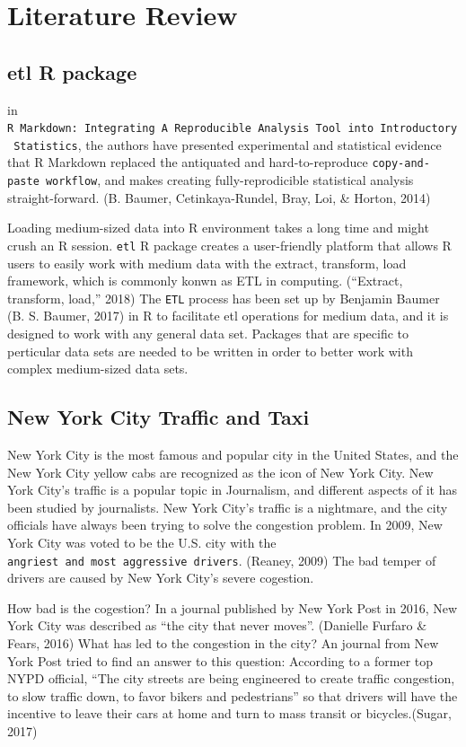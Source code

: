 \documentclass[12pt,twoside]{reedthesis}
\theoremstyle{definition}
\theoremstyle{definition}
\theoremstyle{definition}
\theoremstyle{remark}
\begin{document}
\section{Literature Review}\label{literature-review}

\subsection{etl R package}\label{etl-r-package}

in
\texttt{R\ Markdown:\ Integrating\ A\ Reproducible\ Analysis\ Tool\ into\ Introductory\ Statistics},
the authors have presented experimental and statistical evidence that R
Markdown replaced the antiquated and hard-to-reproduce
\texttt{copy-and-paste\ workflow}, and makes creating fully-reprodicible
statistical analysis straight-forward. (B. Baumer, Cetinkaya-Rundel,
Bray, Loi, \& Horton, 2014)

Loading medium-sized data into R environment takes a long time and might
crush an R session. \texttt{etl} R package creates a user-friendly
platform that allows R users to easily work with medium data with the
extract, transform, load framework, which is commonly konwn as ETL in
computing. (``Extract, transform, load,'' 2018) The \texttt{ETL} process
has been set up by Benjamin Baumer (B. S. Baumer, 2017) in R to
facilitate etl operations for medium data, and it is designed to work
with any general data set. Packages that are specific to perticular data
sets are needed to be written in order to better work with complex
medium-sized data sets.

\subsection{New York City Traffic and
Taxi}\label{new-york-city-traffic-and-taxi}

New York City is the most famous and popular city in the United States,
and the New York City yellow cabs are recognized as the icon of New York
City. New York City's traffic is a popular topic in Journalism, and
different aspects of it has been studied by journalists. New York City's
traffic is a nightmare, and the city officials have always been trying
to solve the congestion problem. In 2009, New York City was voted to be
the U.S. city with the
\texttt{angriest\ and\ most\ aggressive\ drivers}. (Reaney, 2009) The
bad temper of drivers are caused by New York City's severe cogestion.

How bad is the cogestion? In a journal published by New York Post in
2016, New York City was described as ``the city that never moves''.
(Danielle Furfaro \& Fears, 2016) What has led to the congestion in the
city? An journal from New York Post tried to find an answer to this
question: According to a former top NYPD official, ``The city streets
are being engineered to create traffic congestion, to slow traffic down,
to favor bikers and pedestrians'' so that drivers will have the
incentive to leave their cars at home and turn to mass transit or
bicycles.(Sugar, 2017)
\end{document}
